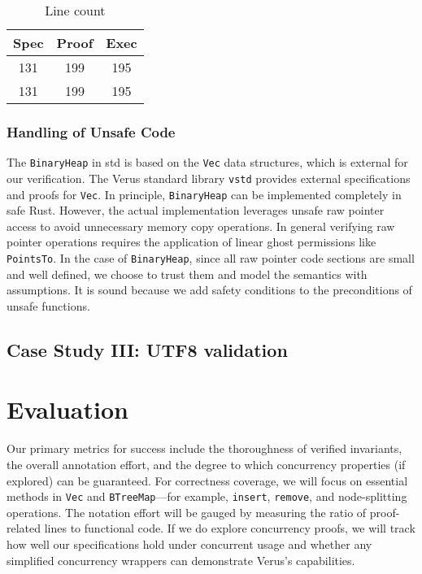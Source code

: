\documentclass[conference]{IEEEtran}
\begin{document}
\begin{table}[h]
\centering
\begin{tabular}{|c|c|c|}
\hline
\textbf{Spec} & \textbf{Proof} & \textbf{Exec} \\
\hline
131 & 199 & 195 \\
\hline
131 & 199 & 195 \\
\hline
\end{tabular}
\caption{Line count}
\end{table}
\subsubsection{Handling of Unsafe Code}
The \texttt{BinaryHeap} in std is based on the \texttt{Vec} data structures, which is external for our verification. The Verus standard library \texttt{vstd} provides external specifications and proofs for \texttt{Vec}. In principle, \texttt{BinaryHeap} can be implemented completely in safe Rust. However, the actual implementation leverages unsafe raw pointer access to avoid unnecessary memory copy operations. In general verifying raw pointer operations requires the application of linear ghost permissions like \texttt{PointsTo}. In the case of \texttt{BinaryHeap}, since all raw pointer code sections are small and well defined, we choose to trust them and model the semantics with assumptions. It is sound because we add safety conditions to the preconditions of unsafe functions.          

\subsection{Case Study III: UTF8 validation}

\section{Evaluation}
Our primary metrics for success include the thoroughness of verified invariants, the overall annotation effort, and the degree to which concurrency properties (if explored) can be guaranteed. For correctness coverage, we will focus on essential methods in \texttt{Vec} and \texttt{BTreeMap}—for example, \texttt{insert}, \texttt{remove}, and node-splitting operations. The notation effort will be gauged by measuring the ratio of proof-related lines to functional code. If we do explore concurrency proofs, we will track how well our specifications hold under concurrent usage and whether any simplified concurrency wrappers can demonstrate Verus’s capabilities.
\end{document}
